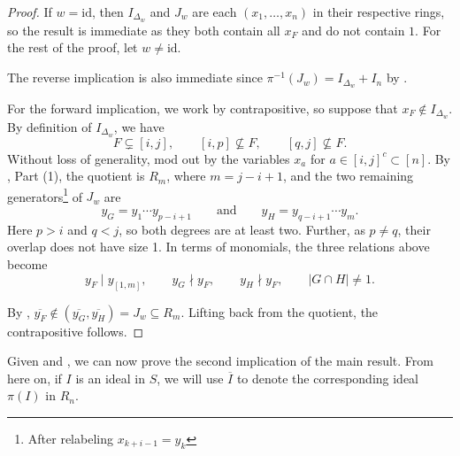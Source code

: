 \begin{proof}
If $w =\mathrm{id}$, then $I_{\Delta_w}$ and $J_w$ are each $(x_1,\dots,x_n)$ in their respective rings, so the result is immediate as they both contain all $x_F$ and do not contain $1$.
For the rest of the proof, let $w\neq \mathrm{id}$.


The reverse implication is also immediate since $\pi^{-1}(J_w)=I_{\Delta_w}+I_n$ by .  

For the forward implication, we work by contrapositive, so suppose that \(x_F\notin I_{\Delta_w}\).  
By definition of $I_{\Delta_w}$, we have
\[ F\subsetneq[i,j],\qquad [i,p]\nsubseteq F,\qquad [q,j]\nsubseteq F.\]
Without loss of generality, mod out by the variables $x_a$ for  \(a\in [i,j]^c\subset[n]\).  
By , Part (1), the quotient is \(R_m\), where \(m=j-i+1\), and the two remaining generators\footnote{After relabeling $x_{k+i-1} = y_{k}$} of \(J_w\) are
\[  
y_G=y_1\cdots y_{p-i+1}\qquad\text{and}\qquad y_H=y_{q-i+1}\cdots y_m.
\]
Here \(p>i\) and \(q<j\), so both degrees are at least two.  
Further, as $p\neq q$, their overlap does not have size 1.
In terms of monomials, the three relations above become  
\[
y_F\mid y_{[1,m]},\qquad y_G\nmid y_F,\qquad y_H\nmid y_F,\qquad |G\cap H|\neq 1.
\]

By , $\overline{y_F}\not\in (\overline{y_G},\overline{y_H}) = J_w \subseteq R_m$.
Lifting back from the quotient, the contrapositive follows.

\end{proof}

Given  and , we can now prove the second implication of the main result. From here on, if $I$ is an ideal in $S$, we will use $\overline{I}$ to denote the corresponding ideal $\pi(I)$ in $R_n$.


